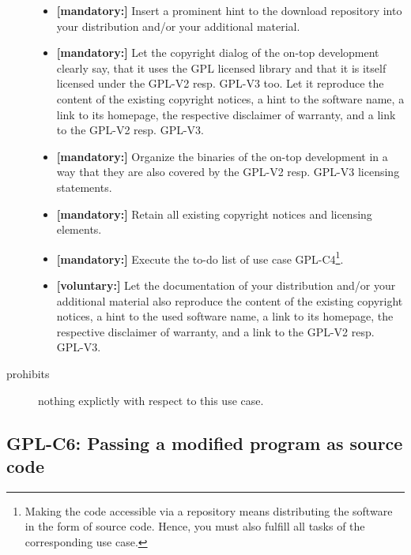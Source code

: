 \begin{description}
\begin{itemize}
  \item \textbf{[mandatory:]} Insert a prominent hint to the download repository
  into your distribution and/or your additional material.


  \item \textbf{[mandatory:]} Let the copyright dialog of the on-top development
  clearly say, that it uses the GPL licensed library and that it is itself
  licensed under the GPL-V2 resp. GPL-V3 too. Let it reproduce the content of
  the existing copyright notices, a hint to the software name, a link to its
  homepage, the respective disclaimer of warranty, and a link to the GPL-V2
  resp. GPL-V3.
  
  \item \textbf{[mandatory:]} Organize the binaries of the on-top development in
  a way that they are also covered by the GPL-V2 resp. GPL-V3 licensing
  statements.
  
  \item \textbf{[mandatory:]} Retain all existing copyright notices and
  licensing elements.
    
  \item \textbf{[mandatory:]} Execute the to-do list of use case GPL-C4\footnote{
  Making the code accessible via a repository means distributing the software in
  the form of source code. Hence, you must also fulfill all tasks of the
  corresponding use case.}.

  \item \textbf{[voluntary:]} Let the documentation of your distribution and/or
  your additional material also reproduce the content of the existing
  copyright notices, a hint to the used software name, a link to its homepage,
  the respective disclaimer of warranty, and a link to the GPL-V2 resp.
  GPL-V3.

\end{itemize}

\item[prohibits] nothing explictly with respect to this use case.

\end{description}


\subsection{GPL-C6: Passing a modified program as source code}
\label{OSUC-04S-GPL} 

